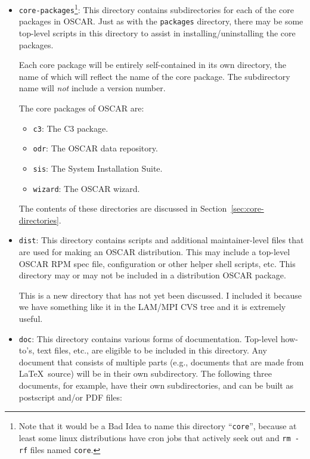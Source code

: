 \begin{itemize}
  
\item {\tt core-packages}\footnote{Note that it would be a Bad Idea to
    name this directory ``{\tt core}'', because at least some linux
    distributions have cron jobs that actively seek out and {\tt rm
      -rf} files named {\tt core}.}: This directory contains
  subdirectories for each of the core packages in OSCAR.  Just as with
  the {\tt packages} directory, there may be some top-level scripts in
  this directory to assist in installing/uninstalling the core
  packages.

  Each core package will be entirely self-contained in its own
  directory, the name of which will reflect the name of the core
  package.  The subdirectory name will {\em not} include a version
  number.

  The core packages of OSCAR are:

  \begin{itemize}
  \item {\tt c3}: The C3 package.
  \item {\tt odr}: The OSCAR data repository.
  \item {\tt sis}: The System Installation Suite.
  \item {\tt wizard}: The OSCAR wizard.
  \end{itemize}
  
  The contents of these directories are discussed in
  Section~\ref{sec:core-directories}.
  
\item {\tt dist}: This directory contains scripts and additional
  maintainer-level files that are used for making an OSCAR
  distribution.  This may include a top-level OSCAR RPM spec file,
  configuration or other helper shell scripts, etc.  This directory
  may or may not be included in a distribution OSCAR package.

  \begin{discuss}
    This is a new directory that has not yet been discussed.  I
    included it because we have something like it in the LAM/MPI CVS
    tree and it is extremely useful.
  \end{discuss}
  
\item {\tt doc}: This directory contains various forms of
  documentation.  Top-level how-to's, text files, etc., are eligible
  to be included in this directory.  Any document that consists of
  multiple parts (e.g., documents that are made from \LaTeX\ source)
  will be in their own subdirectory.  The following three documents,
  for example, have their own subdirectories, and can be built as
  postscript and/or PDF files:


\end{itemize}
